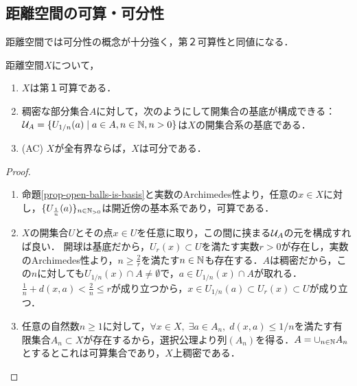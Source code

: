 \documentclass[uplatex,dvipdfmx]{jsreport}
\begin{document}
\subsection{距離空間の可算・可分性}

\begin{tcolorbox}[colframe=ForestGreen, colback=ForestGreen!10!white,breakable,colbacktitle=ForestGreen!40!white,coltitle=black,fonttitle=\bfseries\sffamily,
title=]
    距離空間では可分性の概念が十分強く，第２可算性と同値になる．
\end{tcolorbox}

\begin{proposition}[距離空間では全有界なら可分]\label{prop-sep-metric-space}
    距離空間$X$について，
    \begin{enumerate}
        \item $X$は第１可算である．
        \item 稠密な部分集合$A$に対して，次のようにして開集合の基底が構成できる：$\mathcal{U}_A=\{U_{1/n}(a)\mid a\in A,n\in\mathbb{N},n>0\}$は$X$の開集合系の基底である．
        \item (AC) $X$が全有界ならば，$X$は可分である．
    \end{enumerate}
\end{proposition}
\begin{proof}\mbox{}
    \begin{enumerate}
        \item 命題\ref{prop-open-balls-is-basis}と実数のArchimedes性より，任意の$x\in X$に対し，$\{U_{\frac{1}{n}}(a)\}_{n\in\mathbb{N}_{>0}}$は開近傍の基本系であり，可算である．
        \item $X$の開集合$U$とその点$x\in U$を任意に取り，この間に挟まる$\mathcal{U}_A$の元を構成すれば良い．
        開球は基底だから，$U_r(x)\subset U$を満たす実数$r>0$が存在し，実数のArchimedes性より，$n\ge\frac{2}{r}$を満たす$n\in\mathbb{N}$も存在する．$A$は稠密だから，この$n$に対しても$U_{1/n}(x)\cap A\ne\emptyset$で，$a\in U_{1/n}(x)\cap A$が取れる．
        $\frac{1}{n}+d(x,a)<\frac{2}{n}\le r$が成り立つから，$x\in U_{1/n}(a)\subset U_r(x)\subset U$が成り立つ．
        \item 
        任意の自然数$n\ge 1$に対して，$\forall x\in X,\;\exists a\in A_n,\;d(x,a)\le 1/n$を満たす有限集合$A_n\subset X$が存在するから，選択公理より列$(A_n)$を得る．$A=\cup_{n\in\mathbb{N}}A_n$とするとこれは可算集合であり，$X$上稠密である．
    \end{enumerate}
\end{proof}
\end{document}
